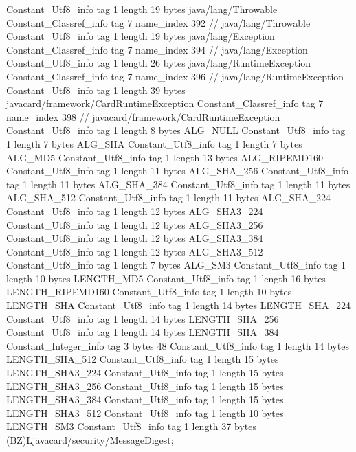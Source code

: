 {{{		}
		Constant_Utf8_info {
			tag	1
			length	19
			bytes	java/lang/Throwable
		}
		Constant_Classref_info {
			tag	7
			name_index	392		// java/lang/Throwable
		}
		Constant_Utf8_info {
			tag	1
			length	19
			bytes	java/lang/Exception
		}
		Constant_Classref_info {
			tag	7
			name_index	394		// java/lang/Exception
		}
		Constant_Utf8_info {
			tag	1
			length	26
			bytes	java/lang/RuntimeException
		}
		Constant_Classref_info {
			tag	7
			name_index	396		// java/lang/RuntimeException
		}
		Constant_Utf8_info {
			tag	1
			length	39
			bytes	javacard/framework/CardRuntimeException
		}
		Constant_Classref_info {
			tag	7
			name_index	398		// javacard/framework/CardRuntimeException
		}
		Constant_Utf8_info {
			tag	1
			length	8
			bytes	ALG_NULL
		}
		Constant_Utf8_info {
			tag	1
			length	7
			bytes	ALG_SHA
		}
		Constant_Utf8_info {
			tag	1
			length	7
			bytes	ALG_MD5
		}
		Constant_Utf8_info {
			tag	1
			length	13
			bytes	ALG_RIPEMD160
		}
		Constant_Utf8_info {
			tag	1
			length	11
			bytes	ALG_SHA_256
		}
		Constant_Utf8_info {
			tag	1
			length	11
			bytes	ALG_SHA_384
		}
		Constant_Utf8_info {
			tag	1
			length	11
			bytes	ALG_SHA_512
		}
		Constant_Utf8_info {
			tag	1
			length	11
			bytes	ALG_SHA_224
		}
		Constant_Utf8_info {
			tag	1
			length	12
			bytes	ALG_SHA3_224
		}
		Constant_Utf8_info {
			tag	1
			length	12
			bytes	ALG_SHA3_256
		}
		Constant_Utf8_info {
			tag	1
			length	12
			bytes	ALG_SHA3_384
		}
		Constant_Utf8_info {
			tag	1
			length	12
			bytes	ALG_SHA3_512
		}
		Constant_Utf8_info {
			tag	1
			length	7
			bytes	ALG_SM3
		}
		Constant_Utf8_info {
			tag	1
			length	10
			bytes	LENGTH_MD5
		}
		Constant_Utf8_info {
			tag	1
			length	16
			bytes	LENGTH_RIPEMD160
		}
		Constant_Utf8_info {
			tag	1
			length	10
			bytes	LENGTH_SHA
		}
		Constant_Utf8_info {
			tag	1
			length	14
			bytes	LENGTH_SHA_224
		}
		Constant_Utf8_info {
			tag	1
			length	14
			bytes	LENGTH_SHA_256
		}
		Constant_Utf8_info {
			tag	1
			length	14
			bytes	LENGTH_SHA_384
		}
		Constant_Integer_info {
			tag	3
			bytes	48
		}
		Constant_Utf8_info {
			tag	1
			length	14
			bytes	LENGTH_SHA_512
		}
		Constant_Utf8_info {
			tag	1
			length	15
			bytes	LENGTH_SHA3_224
		}
		Constant_Utf8_info {
			tag	1
			length	15
			bytes	LENGTH_SHA3_256
		}
		Constant_Utf8_info {
			tag	1
			length	15
			bytes	LENGTH_SHA3_384
		}
		Constant_Utf8_info {
			tag	1
			length	15
			bytes	LENGTH_SHA3_512
		}
		Constant_Utf8_info {
			tag	1
			length	10
			bytes	LENGTH_SM3
		}
		Constant_Utf8_info {
			tag	1
			length	37
			bytes	(BZ)Ljavacard/security/MessageDigest;
}}}
